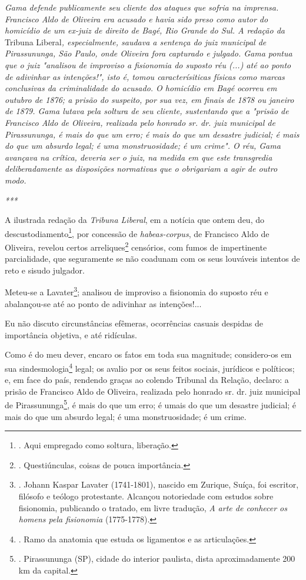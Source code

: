 \emph{Gama defende publicamente seu cliente dos ataques que sofria na
imprensa. Francisco Aldo de Oliveira era acusado e havia sido preso como
autor do homicídio de um ex-juiz de direito de Bagé, Rio Grande do Sul.
A redação da} Tribuna Liberal\emph{, especialmente, saudava a sentença
do juiz municipal de Pirassununga, São Paulo, onde Oliveira fora
capturado e julgado. Gama pontua que o juiz "analisou de improviso a
fisionomia do suposto réu (...) até ao ponto de adivinhar as
intenções!", isto é, tomou caracterísiticas físicas como marcas
conclusivas da criminalidade do acusado. O homicídio em Bagé ocorreu em
outubro de 1876; a prisão do suspeito, por sua vez, em finais de 1878 ou
janeiro de 1879. Gama lutava pela soltura de seu cliente, sustentando
que a "prisão de Francisco Aldo de Oliveira, realizada pelo honrado sr.
dr. juiz municipal de Pirassununga, é mais do que um erro; é mais do que
um desastre judicial; é mais do que um absurdo legal; é uma
monstruosidade; é um crime". O réu, Gama avançava na crítica, deveria
ser o juiz, na medida em que este transgredia deliberadamente as
disposições normativas que o obrigariam a agir de outro modo.}

\emph{***}

A ilustrada redação da \emph{Tribuna Liberal}, em a notícia que ontem
deu, do descustodiamento\footnote{. Aqui empregado como soltura,
  liberação.}, por concessão de \emph{habeas-corpus}, de Francisco Aldo
de Oliveira, revelou certos arreliques\footnote{. Questiúnculas, coisas
  de pouca importância.} censórios, com fumos de impertinente
parcialidade, que seguramente se não coadunam com os seus louváveis
intentos de reto e sisudo julgador.

Meteu-se a Lavater\footnote{. Johann Kaspar Lavater (1741-1801), nascido
  em Zurique, Suíça, foi escritor, filósofo e teólogo protestante.
  Alcançou notoriedade com estudos sobre fisionomia, publicando o
  tratado, em livre tradução, \emph{A arte de conhecer os homens pela
  fisionomia} (1775-1778).}; analisou de improviso a fisionomia do
suposto réu e abalançou-se até ao ponto de adivinhar as intenções!...

Eu não discuto circunstâncias efêmeras, ocorrências casuais despidas de
importância objetiva, e até ridículas.

Como é do meu dever, encaro os fatos em toda sua magnitude; considero-os
em sua sindesmologia\footnote{. Ramo da anatomia que estuda os
  ligamentos e as articulações.} legal; os avalio por os seus feitos
sociais, jurídicos e políticos; e, em face do país, rendendo graças ao
colendo Tribunal da Relação, declaro: a prisão de Francisco Aldo de
Oliveira, realizada pelo honrado sr. dr. juiz municipal de
Pirassununga\footnote{. Pirassununga (SP), cidade do interior paulista,
  dista aproximadamente 200 km da capital.}, é mais do que um erro; é
umais do que um desastre judicial; é mais do que um absurdo legal; é uma
monstruosidade; é um crime.

